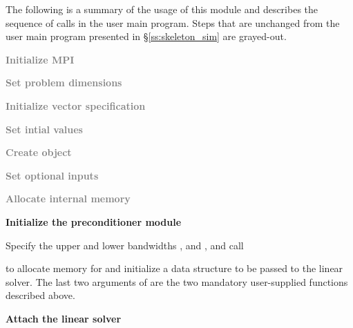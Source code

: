 The following is a summary of the usage of this module and describes the sequence 
of calls in the user main program. Steps that are unchanged from the user main
program presented in \S\ref{ss:skeleton_sim} are grayed-out.
\begin{Steps}
\item 
  \textcolor{gray}{\bf Initialize MPI}

\item
  \textcolor{gray}{\bf Set problem dimensions}

\item
  \textcolor{gray}{\bf Initialize vector specification}

\item
  \textcolor{gray}{\bf Set intial values}
 
\item
  \textcolor{gray}{\bf Create {\cvode} object}

\item
  \textcolor{gray}{\bf Set optional inputs}

\item
  \textcolor{gray}{\bf Allocate internal memory}

\item \label{i:bbdpre_init}
  {\bf Initialize the {\cvbbdpre} preconditioner module}

  Specify the upper and lower bandwidths ,  and
  ,  and call 


  to allocate memory for and initialize a data structure  to be 
  passed to the {\cvspgmr} linear solver. The last two arguments of 
  are the two mandatory user-supplied functions described above.

\item \label{i:bbdpre_attach}
  {\bf Attach the {\cvspgmr} linear solver}



\end{Steps}
